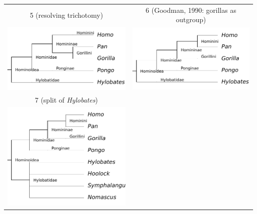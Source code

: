 \begin{tabular}{cc}
5 (resolving trichotomy) & 6 (Goodman, 1990: gorillas as outgroup) \\
\includegraphics[scale=0.7]{homino_4.pdf} & \includegraphics[scale=0.7]{homino_5.pdf} \\
7 (split of \emph{Hylobates}) \\
\includegraphics[scale=0.7]{homino_6.pdf} & 
\end{tabular}

